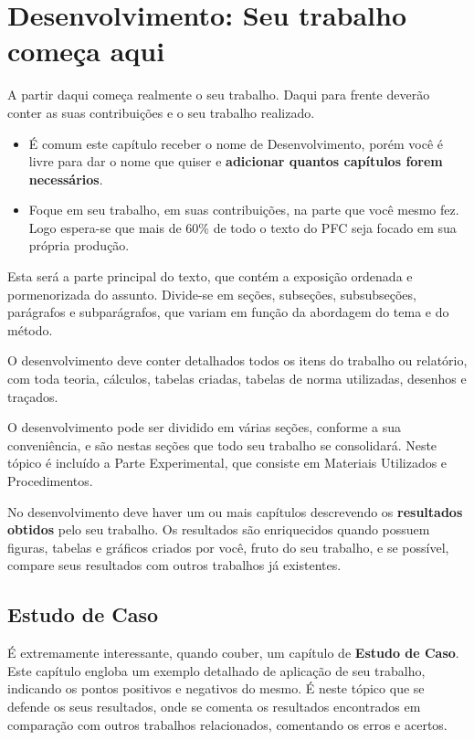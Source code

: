\chapter{Desenvolvimento: Seu trabalho começa aqui}

A partir daqui começa realmente o seu trabalho. Daqui para frente deverão conter as suas contribuições e o seu trabalho realizado.

\begin{CaixaVerde}
    \begin{itemize}
        \item É comum este capítulo receber o nome de Desenvolvimento, porém você é livre para dar o nome que quiser e {\bf adicionar quantos capítulos forem necessários}.
        \item Foque em seu trabalho, em suas contribuições, na parte que você mesmo fez. Logo espera-se que mais de 60\% de todo o texto do PFC seja focado em sua própria produção.
    \end{itemize}
\end{CaixaVerde}

Esta será a parte principal do texto, que contém a exposição ordenada e pormenorizada do assunto. Divide-se em seções, subseções, subsubseções, parágrafos e subparágrafos, que variam em função da abordagem do tema e do método.

O desenvolvimento deve conter detalhados todos os itens do trabalho ou relatório, com toda teoria, cálculos, tabelas criadas, tabelas de norma utilizadas, desenhos e traçados.

O desenvolvimento pode ser dividido em várias seções, conforme a sua conveniência, e são nestas seções que
todo seu trabalho se consolidará. Neste tópico é incluído a Parte Experimental, que consiste em Materiais Utilizados e Procedimentos.

No desenvolvimento deve haver um ou mais capítulos descrevendo os {\bf resultados obtidos} pelo seu trabalho. Os resultados são enriquecidos quando possuem figuras, tabelas e gráficos criados por você, fruto do seu trabalho, e se possível, compare seus resultados com outros trabalhos já existentes.

\section{Estudo de Caso}

É extremamente interessante, quando couber, um capítulo de {\bf Estudo de Caso}. Este capítulo engloba um exemplo
detalhado de aplicação de seu trabalho, indicando os pontos positivos e negativos do mesmo. É neste tópico que se defende os seus resultados, onde se
comenta os resultados encontrados em comparação com outros trabalhos relacionados, comentando os erros e
acertos.

